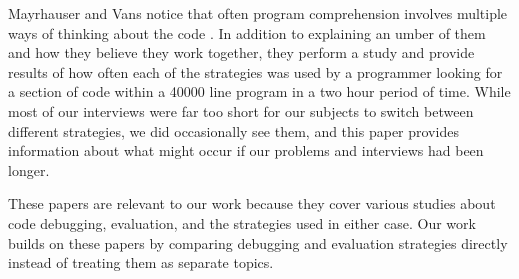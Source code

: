 Mayrhauser and Vans notice that often program comprehension involves multiple ways of thinking about the code \cite{402076}.
In addition to explaining an umber of them and how they believe they work together,
	they perform a study and provide results of how often each of the strategies was used by a programmer looking for a section of code within a 40000 line program in a two hour period of time.
While most of our interviews were far too short for our subjects to switch between different strategies,
	we did occasionally see them, and this paper provides information about what might occur if our problems and interviews had been longer. 

These papers are relevant to our work because they cover various studies about code debugging, evaluation, and the strategies used in either case. Our work builds on these papers by comparing debugging and evaluation strategies directly instead of treating them as separate topics.
